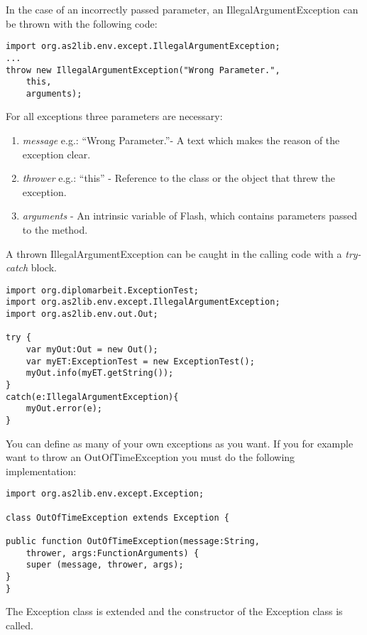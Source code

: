 In the case of an incorrectly passed parameter, an IllegalArgumentException can be thrown with the following code:

\begin{lstlisting}[frame=single]
import org.as2lib.env.except.IllegalArgumentException;
...
throw new IllegalArgumentException("Wrong Parameter.",
	this,
	arguments);
\end{lstlisting}
For all exceptions three parameters are necessary:
\begin{enumerate}
	\item \emph{message} e.g.: ``Wrong Parameter.''- A text which makes the reason of the exception clear.
	\item \emph{thrower} e.g.: ``this'' - Reference to the class or the object that threw the exception.
	\item \emph{arguments} - An intrinsic variable of Flash, which contains parameters passed to the method.
\end{enumerate}
A thrown IllegalArgumentException can be caught in the calling code with a \emph{try-catch} block.
\begin{lstlisting}[frame=single]
import org.diplomarbeit.ExceptionTest;
import org.as2lib.env.except.IllegalArgumentException;
import org.as2lib.env.out.Out;

try {
	var myOut:Out = new Out();
	var myET:ExceptionTest = new ExceptionTest();
	myOut.info(myET.getString());
}
catch(e:IllegalArgumentException){
	myOut.error(e);
}
\end{lstlisting}

You can define as many of your own exceptions as you want. If you for example want to throw an OutOfTimeException you must do the following implementation:
\clearpage
\begin{lstlisting}[frame=single]
import org.as2lib.env.except.Exception;

class OutOfTimeException extends Exception {

public function OutOfTimeException(message:String,
	thrower, args:FunctionArguments) {
	super (message, thrower, args);
}
}
\end{lstlisting}
The Exception class is extended and the constructor of the Exception class is called.